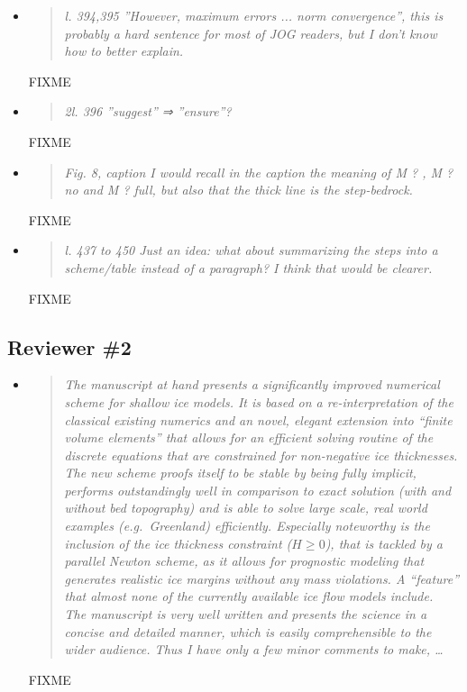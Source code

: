 \documentclass[11pt,reqno]{amsart}
\newcommand{\reply}[2]{
\medskip\medskip
\item  \begin{quote}
\emph{#1}
\end{quote}

\medskip
\noindent #2}
\begin{document}
\begin{itemize}
\reply{l. 394,395 ”However, maximum errors ... norm convergence”, this is probably a hard sentence for most of JOG readers, but I don’t know how to better explain.}
{FIXME}

\reply{2l. 396 ”suggest” ⇒ ”ensure”?}
{FIXME}

\reply{Fig. 8, caption I would recall in the caption the meaning of M ? , M ? no and M ? full, but also that
the thick line is the step-bedrock.}
{FIXME}

\reply{l. 437 to 450 Just an idea: what about summarizing the steps into a scheme/table instead of
a paragraph? I think that would be clearer.}
{FIXME}

\end{itemize}


\subsection*{Reviewer \#2}  \begin{itemize}
\reply{The manuscript at hand presents a significantly improved numerical scheme for shallow ice models. It is based on a re-interpretation of the classical existing numerics and an novel, elegant extension into ``finite volume elements'' that allows for an efficient solving routine of the discrete equations that are constrained for non-negative ice thicknesses. The new scheme proofs itself to be stable by being fully implicit, performs outstandingly well in comparison to exact solution (with and without bed topography) and is able to solve large scale, real world examples (e.g.~Greenland) efficiently. Especially noteworthy is the inclusion of the ice thickness constraint ($H\ge 0$), that is tackled by a parallel Newton scheme, as it allows for prognostic modeling that generates realistic ice margins without any mass violations.  A ``feature'' that almost none of the currently available ice flow models include. \medskip \\
The manuscript is very well written and presents the science in a concise and detailed manner, which is easily comprehensible to the wider audience. Thus I have only a few minor comments to make, \dots}
{FIXME}


\end{itemize}
\end{document}
